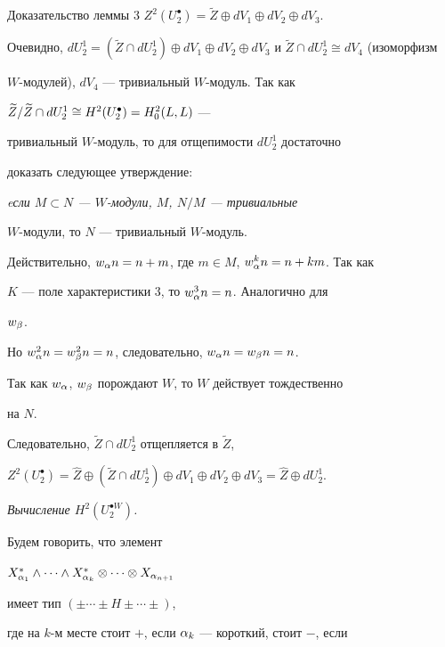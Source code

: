 \begin{pf*}{Доказательство леммы 3}
$Z^2(U^{\bullet}_2)=\widetilde Z \oplus dV_1\oplus dV_2\oplus dV_3$. 


Очевидно, $dU^1_2=(\widetilde Z\cap dU^1_2)\oplus dV_1\oplus 


dV_2\oplus dV_3$ и $\widetilde Z\cap dU^1_2\cong dV_4$ (изоморфизм 


$W$-модулей), $dV_4$ --- тривиальный $W$-модуль. Так как 


$\widetilde Z/\widetilde Z \cap dU^1_2\cong H^2(U^{\bullet}_2)=H^2_0(L,L)$ --- 


тривиальный $W$-модуль, то для отщепимости $dU^1_2$ достаточно 


доказать следующее утверждение: 


{\it eсли $M\subset N$ --- $W$-модули, $M$, $N/M$ --- тривиальные 


$W$-модули, то $N$ --- тривиальный $W$-модуль.} 


 


Действительно, $w_{\alpha}n=n+m$, где $m \in M$, $w_{\alpha}^kn=n+km$. Так как 


$K$ --- поле характеристики 3, то $w_{\alpha}^3n=n$. Аналогично для 


$w_{\beta}$. 


Но $w_{\alpha}^2n=w_{\beta}^2n=n$, следовательно, $w_{\alpha}n=w_{\beta}n=n$. 


Так как $w_{\alpha}$, $w_{\beta}$ порождают $W$, то $W$ действует тождественно 


на $N$. 


 


Следовательно, $\widetilde Z \cap dU^1_2$ отщепляется в $\widetilde Z$, 


$Z^2(U^{\bullet}_2)=\widehat Z\oplus (\widetilde Z \cap dU^1_2)\oplus 


dV_1\oplus dV_2\oplus dV_3=\widehat Z\oplus dU^1_2$. 


\end{pf*} 


 


{\it Вычисление $H^2(U^{\bullet W}_2)$.} 


Будем говорить, что элемент 


$X^*_{\a_1}\wedge\dotsb\wedge X^*_{\a_k}\otimes 


\dotsb\otimes X_{\a_{n+1}}$ 


имеет тип $(\pm \dotsb \pm H \pm \dotsb\pm)$, 


где на $k$-м месте стоит $+$, если $\alpha_k$ --- короткий, стоит $-$, если 


